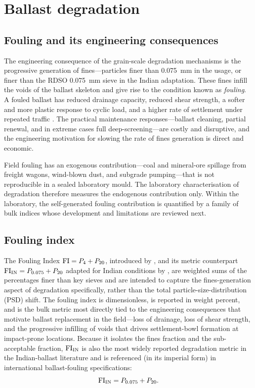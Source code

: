 \section{Ballast degradation}
\label{sec:degradation}

\subsection{Fouling and its engineering consequences}
\label{sec:fouling}

The engineering consequence of the grain-scale degradation mechanisms is the progressive generation of fines---particles finer than \qty{0.075}{\mm} in the \citet{selig1994} usage, or finer than the RDSO \qty{0.075}{\mm} sieve in the Indian adaptation. These fines infill the voids of the ballast skeleton and give rise to the condition known as \emph{fouling}. A fouled ballast has reduced drainage capacity, reduced shear strength, a softer and more plastic response to cyclic load, and a higher rate of settlement under repeated traffic \citep{huang2009,tutumluer2013}. The practical maintenance responses---ballast cleaning, partial renewal, and in extreme cases full deep-screening---are costly and disruptive, and the engineering motivation for slowing the rate of fines generation is direct and economic.

Field fouling has an exogenous contribution---coal and mineral-ore spillage from freight wagons, wind-blown dust, and subgrade pumping---that is not reproducible in a sealed laboratory mould. The laboratory characterisation of degradation therefore measures the endogenous contribution only. Within the laboratory, the self-generated fouling contribution is quantified by a family of bulk indices whose development and limitations are reviewed next.

\subsection{Fouling index}
\label{sec:fouling-index}

The Fouling Index $\mathrm{FI} = P_{4} + P_{20}$, introduced by \citet{selig1994}, and its metric counterpart $\mathrm{FI}_{\mathrm{IN}} = P_{0.075} + P_{20}$ adapted for Indian conditions by \citet{anbazhagan2012}, are weighted sums of the percentages finer than key sieves and are intended to capture the fines-generation aspect of degradation specifically, rather than the total particle-size-distribution (PSD) shift. The fouling index is dimensionless, is reported in weight percent, and is the bulk metric most directly tied to the engineering consequences that motivate ballast replacement in the field---loss of drainage, loss of shear strength, and the progressive infilling of voids that drives settlement-bowl formation at impact-prone locations. Because it isolates the fines fraction and the sub-acceptable fraction, $\mathrm{FI}_{\mathrm{IN}}$ is also the most widely reported degradation metric in the Indian-ballast literature and is referenced (in its imperial form) in international ballast-fouling specifications:
\begin{equation}
  \mathrm{FI}_{\mathrm{IN}} = P_{0.075} + P_{20}.
  \label{eq:fiin}
\end{equation}

